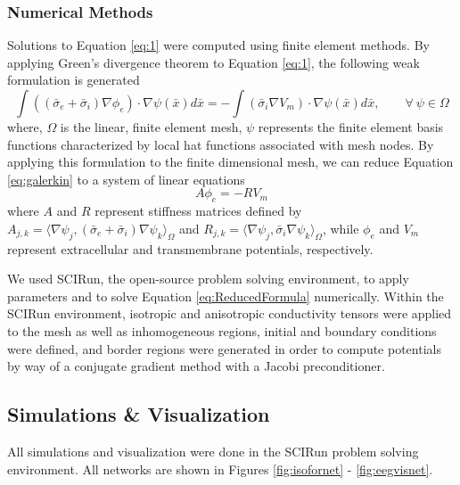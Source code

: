 \subsubsection{Numerical Methods}
\label{sec:numerical}


Solutions to Equation \ref{eq:1} were computed using finite element methods.  By applying 
Green's divergence theorem to Equation \ref{eq:1}, the following weak formulation is generated 
\begin{equation}
\int ((\bar{\sigma}_e + \bar{\sigma}_i)\nabla \phi_e) \cdot \nabla \psi(\bar{x})d\bar{x} = - \int (\bar{\sigma}
_i \nabla V_m)\cdot \nabla \psi(\bar{x})d\bar{x}, \quad \quad \forall \ \psi \in \Omega
\label{eq:galerkin}
\end{equation}
where, $\Omega$ is the linear, finite element mesh, $\psi$ represents the finite element basis functions characterized by local hat functions associated with mesh nodes. By applying this formulation to the finite dimensional mesh, we can reduce Equation \ref{eq:galerkin} to a system of linear equations 
\begin{equation}
A \phi_e = -RV_m
\label{eq:ReducedFormula}
\end{equation}
where $A$ and $R$ represent stiffness matrices defined by $A_{j,k} = \langle \nabla \psi_j,(\bar{\sigma}
_e + \bar{\sigma}_i)\nabla \psi_k \rangle_\Omega$ and $R_{j,k} = \langle \nabla \psi_j,\bar{\sigma}_i
\nabla \psi_k \rangle_\Omega$,
while $\phi_e$ and $V_m$ represent extracellular and transmembrane potentials, respectively.\cite{ref:fem}

We used SCIRun, the open-source problem solving environment, to apply parameters and to solve Equation  \ref{eq:ReducedFormula} numerically.  Within the SCIRun environment, isotropic and anisotropic conductivity tensors were applied to the mesh as well as inhomogeneous regions, initial and boundary conditions were defined, and border regions were generated in order to compute potentials by way of a conjugate gradient method with a Jacobi preconditioner.

\subsection{Simulations \& Visualization}
\label{sec:sim}

All simulations and visualization were done in the SCIRun problem solving environment. All networks are shown in Figures \ref{fig:isofornet} - \ref{fig:eegvisnet}.

